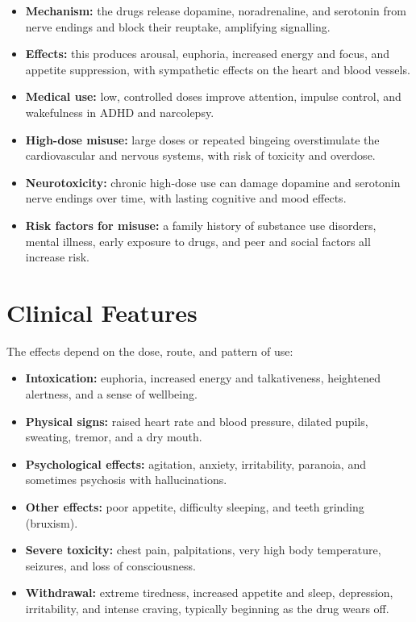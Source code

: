\begin{itemize}
    \item \textbf{Mechanism:} the drugs release dopamine, noradrenaline, and serotonin from nerve endings and block their reuptake, amplifying signalling.
    \item \textbf{Effects:} this produces arousal, euphoria, increased energy and focus, and appetite suppression, with sympathetic effects on the heart and blood vessels.
    \item \textbf{Medical use:} low, controlled doses improve attention, impulse control, and wakefulness in ADHD and narcolepsy.
    \item \textbf{High-dose misuse:} large doses or repeated bingeing overstimulate the cardiovascular and nervous systems, with risk of toxicity and overdose.
    \item \textbf{Neurotoxicity:} chronic high-dose use can damage dopamine and serotonin nerve endings over time, with lasting cognitive and mood effects.
    \item \textbf{Risk factors for misuse:} a family history of substance use disorders, mental illness, early exposure to drugs, and peer and social factors all increase risk.
\end{itemize}

\section*{Clinical Features}
The effects depend on the dose, route, and pattern of use:

\begin{itemize}
    \item \textbf{Intoxication:} euphoria, increased energy and talkativeness, heightened alertness, and a sense of wellbeing.
    \item \textbf{Physical signs:} raised heart rate and blood pressure, dilated pupils, sweating, tremor, and a dry mouth.
    \item \textbf{Psychological effects:} agitation, anxiety, irritability, paranoia, and sometimes psychosis with hallucinations.
    \item \textbf{Other effects:} poor appetite, difficulty sleeping, and teeth grinding (bruxism).
    \item \textbf{Severe toxicity:} chest pain, palpitations, very high body temperature, seizures, and loss of consciousness.
    \item \textbf{Withdrawal:} extreme tiredness, increased appetite and sleep, depression, irritability, and intense craving, typically beginning as the drug wears off.
\end{itemize}

